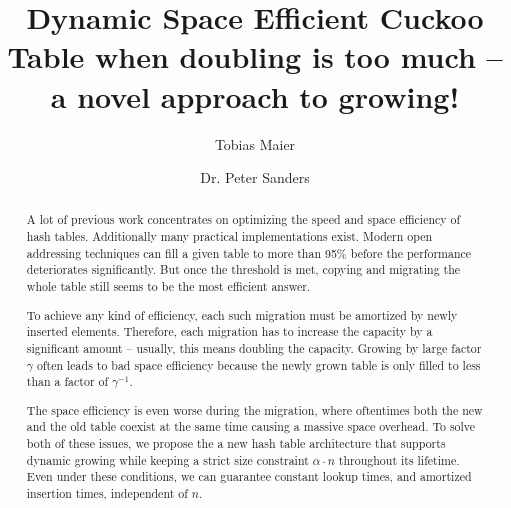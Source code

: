 \documentclass[a4paper,UKenglish]{lipics-v2016}
\title{Dynamic Space Efficient Cuckoo Table when doubling is too much -- a novel approach to growing!}
\author[1]{Tobias Maier}
\author[1]{Dr. Peter Sanders}
\affil[1]{Karlsruhe Institute of Technology, Karlsruhe, Deutschland\\
  \texttt{\{t.maier, sanders\}@kit.edu}}
\begin{document}
\maketitle

\begin{abstract}
A lot of previous work concentrates on optimizing the speed and space
efficiency of hash tables.  Additionally many practical
implementations exist.  Modern open addressing techniques can fill a
given table to more than 95\% before the performance deteriorates
significantly.  But once the threshold is met, copying and migrating
the whole table still seems to be the most efficient answer.

To achieve any kind of efficiency, each such migration must be
amortized by newly inserted elements.  Therefore, each migration has
to increase the capacity by a significant amount -- usually, this
means doubling the capacity.  Growing by large factor
$\gamma$ often leads to bad space efficiency because the newly grown table
is only filled to less than a factor of $\gamma^{-1}$.

The space efficiency is even worse during the migration, where
oftentimes both the new and the old table coexist at the same time
causing a massive space overhead.  To solve both of these issues, we
propose the a new hash table architecture that supports dynamic
growing while keeping a strict size constraint $\alpha \cdot n$
throughout its lifetime.  Even under these conditions, we can
guarantee constant lookup times, and amortized insertion times,
independent of $n$.
 \end{abstract}
\end{document}
